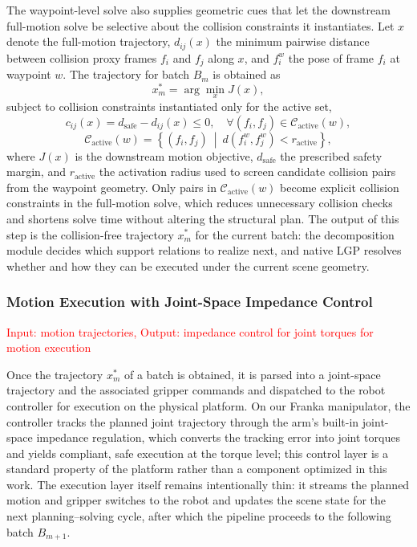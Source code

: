 \documentclass[journal]{IEEEtran}
\begin{document}
The waypoint-level solve also supplies geometric cues that let the downstream
full-motion solve be selective about the collision constraints it
instantiates. Let $x$ denote the full-motion trajectory, $d_{ij}(x)$ the
minimum pairwise distance between collision proxy frames $f_i$ and $f_j$
along $x$, and $f_i^w$ the pose of frame $f_i$ at waypoint $w$. The
trajectory for batch $B_m$ is obtained as
\begin{equation}
x_m^\ast = \arg\min_x J(x),
\label{eq:act_obj}
\end{equation}
subject to collision constraints instantiated only for the active set,
\begin{equation}
c_{ij}(x) = d_{\mathrm{safe}} - d_{ij}(x) \leq 0,
\quad \forall (f_i, f_j) \in \mathcal{C}_{\mathrm{active}}(w),
\label{eq:act_c}
\end{equation}
\begin{equation}
\mathcal{C}_{\mathrm{active}}(w) =
\left\{(f_i, f_j)\ \middle|\ d(f_i^w, f_j^w) < r_{\mathrm{active}}\right\},
\label{eq:act_set}
\end{equation}
where $J(x)$ is the downstream motion objective, $d_{\mathrm{safe}}$ the
prescribed safety margin, and $r_{\mathrm{active}}$ the activation radius
used to screen candidate collision pairs from the waypoint geometry. Only
pairs in $\mathcal{C}_{\mathrm{active}}(w)$ become explicit collision
constraints in the full-motion solve, which reduces unnecessary collision
checks and shortens solve time without altering the structural plan. The
output of this step is the collision-free trajectory $x_m^\ast$ for the
current batch: the decomposition module decides which support relations to
realize next, and native LGP resolves whether and how they can be executed
under the current scene geometry.

\subsubsection{Motion Execution with Joint-Space Impedance Control}
\textcolor{red}{Input: motion trajectories, Output: impedance control for joint torques for motion execution}

Once the trajectory $x_m^\ast$ of a batch is obtained, it is parsed into a
joint-space trajectory and the associated gripper commands and dispatched to
the robot controller for execution on the physical platform. On our Franka
manipulator, the controller tracks the planned joint trajectory through the
arm's built-in joint-space impedance regulation, which converts the tracking
error into joint torques and yields compliant, safe execution at the torque
level; this control layer is a standard property of the platform rather than
a component optimized in this work. The execution layer itself remains
intentionally thin: it streams the planned motion and gripper switches to the
robot and updates the scene state for the next planning--solving cycle, after
which the pipeline proceeds to the following batch $B_{m+1}$.
\end{document}
